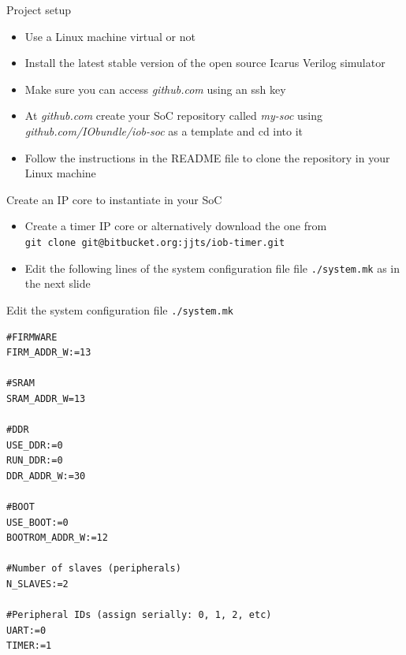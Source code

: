 \documentclass [xcolor=svgnames, t] {beamer}
\begin{document}
\begin{frame}{Project setup}
\begin{center}
  \begin{itemize}
    \item Use a Linux machine virtual or not
    \item Install the latest stable version of the open source Icarus Verilog simulator
    \item Make sure you can access {\it github.com} using an ssh key
    \item At {\it github.com} create your SoC repository  called {\it my-soc} using {\it github.com/IObundle/iob-soc} as a template and cd into it
    \item Follow the instructions in the README file to clone the repository in your Linux machine
  \end{itemize}
\end{center}
\end{frame}


\begin{frame}{Create an IP core to instantiate in your SoC}
\begin{itemize}
\item Create a timer IP core or alternatively download the one from
  \\{\tt git clone git@bitbucket.org:jjts/iob-timer.git}
\item Edit the following lines of the system configuration file file {\tt ./system.mk} as in the next slide
\end{itemize}
\end{frame}

\begin{frame}[fragile]{Edit the system configuration file {\tt ./system.mk}}
\begin{tiny}
\begin{lstlisting}
#FIRMWARE
FIRM_ADDR_W:=13

#SRAM
SRAM_ADDR_W=13

#DDR
USE_DDR:=0
RUN_DDR:=0
DDR_ADDR_W:=30

#BOOT
USE_BOOT:=0
BOOTROM_ADDR_W:=12

#Number of slaves (peripherals)
N_SLAVES:=2

#Peripheral IDs (assign serially: 0, 1, 2, etc)
UART:=0
TIMER:=1
\end{lstlisting}
\end{tiny}
\end{frame}
\end{document}
